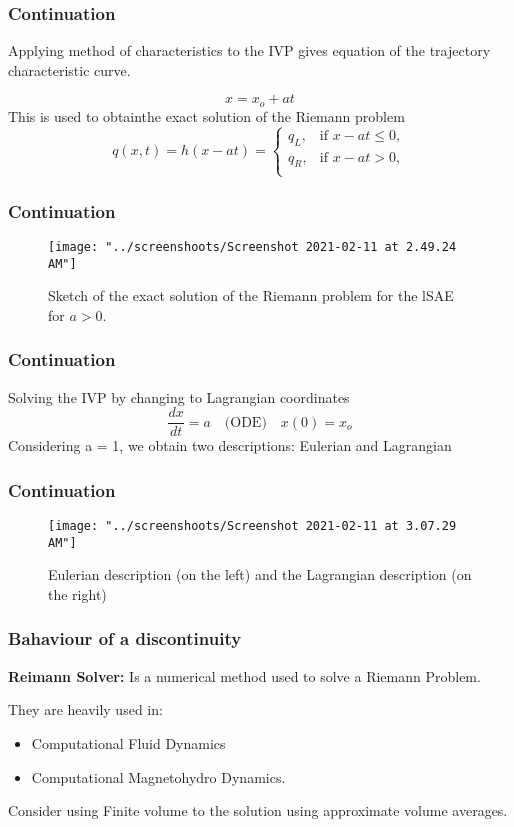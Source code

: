 \documentclass[12pt]{beamer}
\begin{document}
\begin{frame}
	\frametitle{Continuation}
	Applying method of characteristics to the IVP gives  equation of the trajectory characteristic curve.
	
	$$x = x_{o} + at $$
	\pause 
	This is used to obtainthe exact solution of the Riemann problem
	\begin{equation}
		q(x,t) = h(x-at)  = \begin{cases}
			q_{L}, & \text{if $x - at \le 0,$}\\
			q_{R},& \text{if $x - at > 0,$}\\
			
		\end{cases}       
	\end{equation}

\end{frame}

\begin{frame}
	\frametitle{Continuation}
	\begin{figure}
		\centering
		\texttt{[image: "../screenshoots/Screenshot 2021-02-11 at 2.49.24 AM"]}
		\caption{Sketch of the exact solution of the Riemann problem for the lSAE for $a > 0$.}
		\label{fig:exact_solution}
	\end{figure}
	
	
\end{frame}

\begin{frame}
	\frametitle{Continuation}
	Solving the IVP by changing to Lagrangian coordinates 
	$$\dfrac{dx}{dt} = a \quad \text{(ODE)} \quad x(0) = x_{o}$$
	Considering a = 1, we obtain two descriptions: Eulerian and Lagrangian
	
\end{frame}

\begin{frame}
	\frametitle{Continuation}
	\begin{figure}
		\centering
		\texttt{[image: "../screenshoots/Screenshot 2021-02-11 at 3.07.29 AM"]}
		\caption{Eulerian description (on the left) and the Lagrangian description (on the right)}
		\label{fig:screenshot-2021-02-11-at-3}
	\end{figure}
	
	
\end{frame}

\begin{frame}
	\frametitle{Bahaviour of a discontinuity}
	\textbf{Reimann Solver:} Is a numerical method used to solve a Riemann Problem.  
	
	\pause
	They are heavily  used in: 
	\begin{itemize}
		\item Computational Fluid Dynamics 
		\item Computational Magnetohydro Dynamics.
	\end{itemize}
	\pause
	Consider using Finite volume to the solution using approximate volume averages.
\end{frame}
\end{document}
